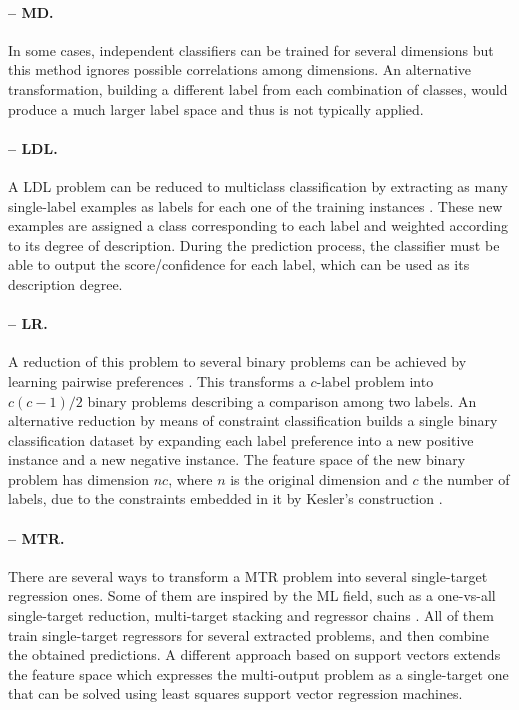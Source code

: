 \paragraph{-- MD.} In some cases, independent classifiers can be trained for several dimensions \cite{mdc,mdc-indep} but this method ignores possible correlations among dimensions. An alternative transformation, building a different label from each combination of classes, would produce a much larger label space and thus is not typically applied.

\paragraph{-- LDL.} A LDL problem can be reduced to multiclass classification by extracting as many single-label examples as labels for each one of the training instances \cite{ldl}. These new examples are assigned a class corresponding to each label and weighted according to its degree of description. During the prediction process, the classifier must be able to output the score/confidence for each label, which can be used as its description degree.

\paragraph{-- LR.} A reduction of this problem to several binary problems can be achieved by learning pairwise preferences \cite{lrankpairwise}. This transforms a $c$-label problem into $c(c-1)/2$ binary problems describing a comparison among two labels. An alternative reduction by means of constraint classification \cite{lr-constraint} builds a single binary classification dataset by expanding each label preference into a new positive instance and a new negative instance. The feature space of the new binary problem has dimension $nc$, where $n$ is the original dimension and $c$ the number of labels, due to the constraints embedded in it by Kesler's construction \cite{nilsson}.

\paragraph{-- MTR.} There are several ways to transform a MTR problem into several single-target regression ones. Some of them are inspired by the ML field, such as a one-vs-all single-target reduction, multi-target stacking and regressor chains \cite{mtrviaml}. All of them train single-target regressors for several extracted problems, and then combine the obtained predictions. A different approach based on support vectors \cite{mtr-lssvr} extends the feature space which expresses the multi-output problem as a single-target one that can be solved using least squares support vector regression machines.

